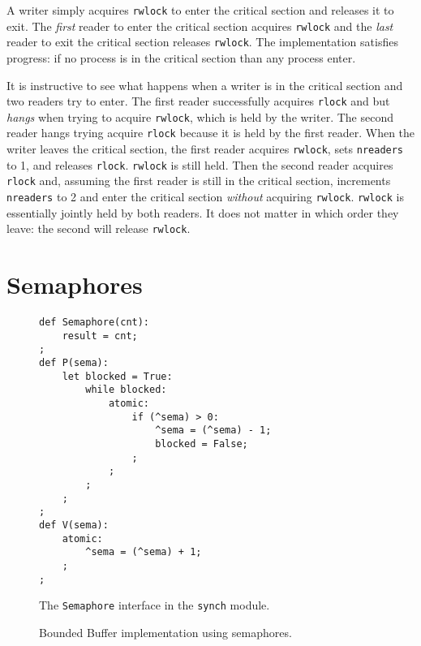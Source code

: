 \documentclass{report}
\newenvironment{code}{
\tcolorbox
}{
\endtcolorbox
}
\begin{document}
A writer simply acquires \texttt{rwlock} to enter the critical section
and releases it to exit.  The \emph{first} reader to enter the critical
section acquires \texttt{rwlock} and the \emph{last} reader to exit
the critical section releases \texttt{rwlock}.
The implementation satisfies progress: if no process is in the critical
section than any process enter.

It is instructive to see what happens when a writer is in the critical
section and two readers try to enter.  The first reader successfully
acquires \texttt{rlock} and but \emph{hangs} when trying to acquire
\texttt{rwlock}, which is held by the writer.  The second reader hangs
trying acquire \texttt{rlock} because it is held by the first reader.
When the writer leaves the critical section, the first reader acquires
\texttt{rwlock}, sets \texttt{nreaders} to 1, and releases \texttt{rlock}.
\texttt{rwlock} is still held.
Then the second reader acquires \texttt{rlock} and, assuming the first
reader is still in the critical section, increments \texttt{nreaders} to 2
and enter the critical section \emph{without} acquiring \texttt{rwlock}.
\texttt{rwlock} is essentially jointly held by both readers.
It does not matter in which order they leave: the second will release
\texttt{rwlock}.

\chapter{Semaphores}

\begin{figure}
\begin{code}
\begin{verbatim}
def Semaphore(cnt):
    result = cnt;
;
def P(sema):
    let blocked = True:
        while blocked:
            atomic:
                if (^sema) > 0:
                    ^sema = (^sema) - 1;
                    blocked = False;
                ;
            ;
        ;
    ;
;
def V(sema):
    atomic:
        ^sema = (^sema) + 1;
    ;
;
\end{verbatim}
\end{code}
\caption{The \texttt{Semaphore} interface in the \texttt{synch} module.}
\label{fig:semaphore}
\end{figure}

\begin{figure}
\begin{code}

\end{code}
\caption{Bounded Buffer implementation using semaphores.}
\label{fig:boundedbuffer}
\end{figure}
\end{document}
